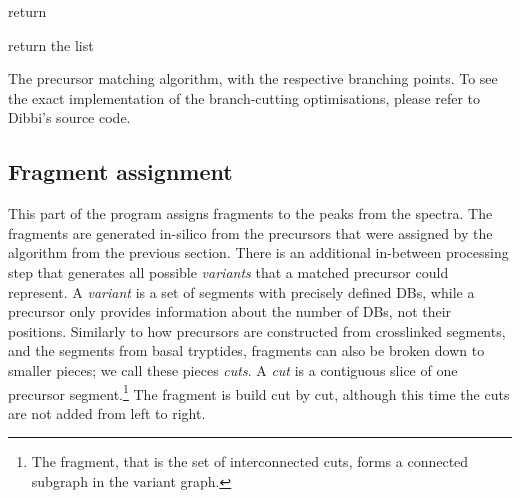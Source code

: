 \begin{algorithm}
	\begin{algorithmic}

		\label{alg:findprec:combinations} 
		\EndIf

		\State return  
		\EndIf

		\label{alg:findprec:end}
		\EndFor
		\EndIf


		\label{alg:findprec:elongate}

		\State return the list 
		\EndFunction
	\end{algorithmic}
	\caption{The precursor matching algorithm, with the respective branching points. To see the exact implementation of the branch-cutting optimisations, please refer to Dibbi's source code.}\label{alg:findprec}
\end{algorithm}

\subsection{Fragment assignment}

This part of the program assigns fragments to the peaks from the spectra. The fragments are generated in-silico from the precursors that were assigned by the algorithm from the previous section. There is an additional in-between processing step that generates all possible \emph{variants} that a matched precursor could represent. A \emph{variant} is a set of segments with precisely defined DBs, while a precursor only provides information about the number of DBs, not their positions. Similarly to how precursors are constructed from crosslinked segments, and the segments from basal tryptides, fragments can also be broken down to smaller pieces; we call these pieces \emph{cuts}. A \emph{cut} is a contiguous slice of one precursor segment.\footnote{The fragment, that is the set of interconnected cuts, forms a connected subgraph in the variant graph.} The fragment is build cut by cut, although this time the cuts are not added from left to right.

